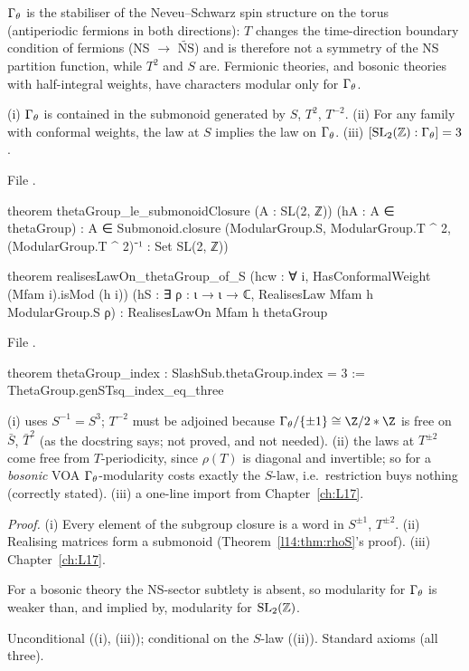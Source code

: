 \begin{physics}
$\Gamma_\theta$ is the stabiliser of the Neveu--Schwarz spin structure on the torus (antiperiodic fermions in both directions):
$T$ changes the time-direction boundary condition of fermions (NS $\to$ $\widetilde{\mathrm{NS}}$) and is therefore not a
symmetry of the NS partition function, while $T^2$ and $S$ are. Fermionic theories, and bosonic theories with half-integral
weights, have characters modular only for $\Gamma_\theta$.
\end{physics}

\begin{theorem}\label{l14:thm:thetamonoid}
(i) $\Gamma_\theta$ is contained in the submonoid generated by $S$, $T^2$, $T^{-2}$. (ii) For any family with conformal weights, the
law at $S$ implies the law on $\Gamma_\theta$. (iii) $[\mathrm{SL}_2(\mathbb{Z}):\Gamma_\theta] = 3$.
\end{theorem}
\noindent File .
\begin{leancode}
theorem thetaGroup_le_submonoidClosure (A : SL(2, ℤ)) (hA : A ∈ thetaGroup) :
    A ∈ Submonoid.closure
      ({ModularGroup.S, ModularGroup.T ^ 2, (ModularGroup.T ^ 2)⁻¹} : Set SL(2, ℤ))

theorem realisesLawOn_thetaGroup_of_S (hcw : ∀ i, HasConformalWeight (Mfam i).isMod (h i))
    (hS : ∃ ρ : ι → ι → ℂ, RealisesLaw Mfam h ModularGroup.S ρ) :
    RealisesLawOn Mfam h thetaGroup
\end{leancode}
\noindent File .
\begin{leancode}
theorem thetaGroup_index : SlashSub.thetaGroup.index = 3 :=
  ThetaGroup.genSTsq_index_eq_three
\end{leancode}
\begin{dictionary}
(i) uses $S^{-1} = S^3$; $T^{-2}$ must be adjoined because $\lfourteenGt/\{\pm1\}\cong\Z/2*\Z$ is free on $\bar S$, $\bar T^2$ (as the
docstring says; not proved, and not needed). (ii) the laws at $T^{\pm2}$ come free from $T$-periodicity, since $\rho(T)$ is
diagonal and invertible; so for a \emph{bosonic} VOA $\Gamma_\theta$-modularity costs exactly the $S$-law, i.e.\ restriction buys
nothing (correctly stated). (iii) a one-line import from Chapter~\ref{ch:L17}.
\end{dictionary}
\noindent\emph{Proof.} (i) Every element of the subgroup closure is a word in $S^{\pm1}$, $T^{\pm2}$. (ii) Realising matrices
form a submonoid (Theorem~\ref{l14:thm:rhoS}'s proof). (iii) Chapter~\ref{ch:L17}.
\begin{physics}
For a bosonic theory the NS-sector subtlety is absent, so modularity for $\Gamma_\theta$ is weaker than, and implied by, modularity
for $\mathrm{SL}_2(\mathbb{Z})$.
\end{physics}
\begin{status}
Unconditional ((i), (iii)); conditional on the $S$-law ((ii)). Standard axioms (all three).
\end{status}

